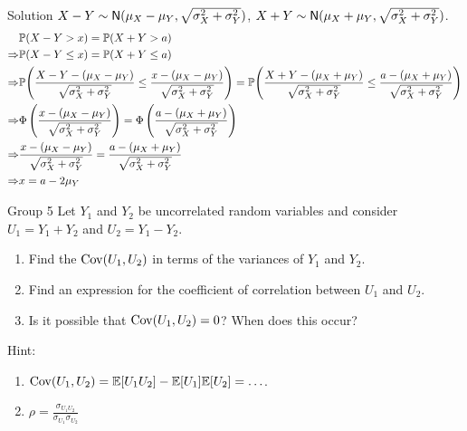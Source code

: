 \documentclass{article}
\begin{document}
\begin{solution}
    {Solution}
    $X-Y\sim \mathsf{N}(\mu_X-\mu_Y,\sqrt{\sigma_X^2+\sigma_Y^2})$, $X+Y\sim \mathsf{N}(\mu_X+\mu_Y,\sqrt{\sigma_X^2+\sigma_Y^2})$.
    \begin{align*}
        &\P{X-Y>x} = \P{X+Y>a} \\
        \Rightarrow
        &\P{X-Y\leq x} = \P{X+Y\leq a} \\
        \Rightarrow
        &\P{\frac{X-Y-(\mu_X-\mu_Y)}{\sqrt{\sigma_X^2+\sigma_Y^2}}\leq \frac{x-(\mu_X-\mu_Y)}{\sqrt{\sigma_X^2+\sigma_Y^2}}} = \P{\frac{X+Y-(\mu_X+\mu_Y)}{\sqrt{\sigma_X^2+\sigma_Y^2}}\leq \frac{a-(\mu_X+\mu_Y)}{\sqrt{\sigma_X^2+\sigma_Y^2}}} \\
        \Rightarrow
        &\Phi\left(\frac{x-(\mu_X-\mu_Y)}{\sqrt{\sigma_X^2+\sigma_Y^2}}\right) = \Phi\left(\frac{a-(\mu_X+\mu_Y)}{\sqrt{\sigma_X^2+\sigma_Y^2}}\right) \\
        \Rightarrow
        &\frac{x-(\mu_X-\mu_Y)}{\sqrt{\sigma_X^2+\sigma_Y^2}} = \frac{a-(\mu_X+\mu_Y)}{\sqrt{\sigma_X^2+\sigma_Y^2}} \\
        \Rightarrow
        &x = a-2\mu_Y
    \end{align*}
\end{solution}

\begin{problem}
    {Group 5}
    Let $Y_1$ and $Y_2$ be uncorrelated random variables and consider $U_1 = Y_1 + Y_2$ and $U_2 = Y_1 - Y_2$.
    \begin{enumerate}
        \item Find the $\mathop{\mathrm{Cov}}\nolimits(U_1, U_2)$ in terms of the variances of $Y_1$ and $Y_2$.
        \item Find an expression for the coefficient of correlation between $U_1$ and $U_2$.
        \item Is it possible that $\mathop{\mathrm{Cov}}\nolimits(U_1, U_2) = 0$? When does this occur?
    \end{enumerate}
    \begin{solution}
        {Hint:}
        \begin{enumerate}
            \item $\Cov(U_1,U_2)=\E{U_1U_2}-\E{U_1}\E{U_2}=\ldots$.
            \item $\rho=\frac{\sigma_{U_1U_2}}{\sigma_{U_1}\sigma_{U_2}}$
        \end{enumerate}
    \end{solution}
\end{problem}
\end{document}

